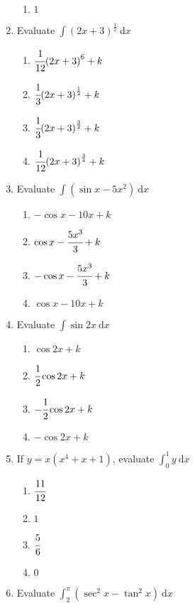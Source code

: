 \begin{multicols}{2}
\begin{enumerate}[label={\arabic*.}]
\begin{enumerate}[label={\Alph*.}]
        \item \(1\)
      \end{enumerate}
    \item Evaluate \(\displaystyle \int {\left(2x+3\right)}^{\frac{1}{2}}\ \mathrm{d}x\)
      \begin{enumerate}[label={\Alph*.}]
        \item \(\cfrac{1}{12}{(2x+3)}^6 + k\)
        \item \(\cfrac{1}{3}{(2x+3)}^{\frac{1}{2}} + k\)
        \item \(\cfrac{1}{3}{(2x+3)}^{\frac{3}{2}} + k\)
        \item \(\cfrac{1}{12}{(2x+3)}^{\frac{3}{4}} + k\)
      \end{enumerate}
    \item Evaluate \(\displaystyle \int \left(\sin{x} - 5{x}^{2}\right)\ \mathrm{d}x\)
      \begin{enumerate}[label={\Alph*.}]
        \item \(-\cos{x} - 10x + k\)
        \item \(\cos{x} - \cfrac{5x^3}{3} + k\)
        \item \(-\cos{x} - \cfrac{5x^3}{3} + k\)
        \item \(\cos{x} - 10x + k\)
      \end{enumerate}
    \item Evaluate \(\displaystyle \int \sin{2x}\ \mathrm{d}x\)
      \begin{enumerate}[label={\Alph*.}]
        \item \(\cos{2x} + k\)
        \item \(\cfrac{1}{2}\cos{2x} + k\)
        \item \(-\cfrac{1}{2}\cos{2x} + k\)
        \item \(-\cos{2x} + k\)
      \end{enumerate}
    \item If \(y = x(x^4 + x + 1)\), evaluate \(\displaystyle \int_{0}^{1} y\ \mathrm{d}x\)
      \begin{enumerate}[label={\Alph*.}]
        \item \(\cfrac{11}{12}\)
        \item \(1\)
        \item \(\cfrac{5}{6}\)
        \item \(0\)
      \end{enumerate}
    \item Evaluate \(\displaystyle \int_{2}^{\pi} (\sec^{2}{x} - \tan^{2}{x})\ \mathrm{d}x\)

\end{enumerate}
\end{multicols}
